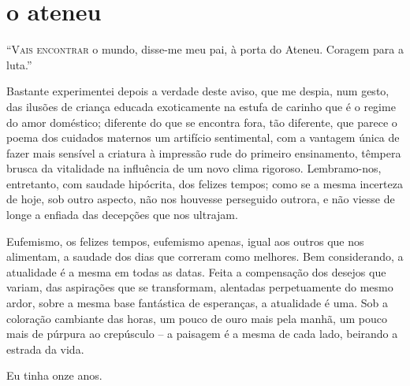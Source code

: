 
\renewcommand\sectionitem{}

\chapter*{o ateneu}
\sectionitem

\noindent\textsc{``Vais encontrar} o mundo, disse{}-me meu pai, 
à porta do Ateneu. Coragem para a luta.'' 


Bastante experimentei depois a verdade deste aviso, que
me despia, num gesto, das ilusões de criança educada exoticamente na
estufa de carinho que é o regime do amor doméstico; diferente do que se
encontra fora, tão diferente, que parece o poema dos cuidados maternos
um artifício sentimental, com a vantagem única de fazer mais sensível a
criatura à impressão rude do primeiro ensinamento, têmpera brusca da
vitalidade na influência de um novo clima rigoroso. Lembramo{}-nos,
entretanto, com saudade hipócrita, dos felizes tempos; como se a mesma
incerteza de hoje, sob outro aspecto, não nos houvesse perseguido
outrora, e não viesse de longe a enfiada das decepções que nos ultrajam. 

Eufemismo, os felizes tempos, eufemismo apenas, igual aos
outros que nos alimentam, a saudade dos dias que correram como
melhores. Bem considerando, a atualidade é a mesma em todas as datas.
Feita a compensação dos desejos que variam, das aspirações que se
transformam, alentadas perpetuamente do mesmo ardor, sobre a mesma base
fantástica de esperanças, a atualidade é uma. Sob a coloração cambiante
das horas, um pouco de ouro mais pela manhã, um pouco mais de púrpura
ao crepúsculo -- a paisagem é a mesma de cada lado, beirando a estrada
da vida. 

Eu tinha onze anos. 

